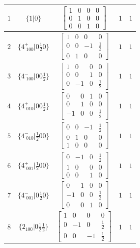 \documentclass[fleqn,8pt]{jsarticle}
\begin{document}
\begin{longtable}{ccccc}
$ 1 $ & $ \{1|0\} $ & $ \begin{bmatrix} 1 & 0 & 0 & 0 \\ 0 & 1 & 0 & 0 \\ 0 & 0 & 1 & 0 \end{bmatrix} $ & $ 1 $ & $ 1 $ \\ \hline
$ 2 $ & $ \{4^{+}_{\,\,100}|0 \frac{1}{2} 0\} $ & $ \begin{bmatrix} 1 & 0 & 0 & 0 \\ 0 & 0 & -1 & \frac{1}{2} \\ 0 & 1 & 0 & 0 \end{bmatrix} $ & $ 1 $ & $ 1 $ \\ \hline
$ 3 $ & $ \{4^{-}_{\,\,100}|0 0 \frac{1}{2}\} $ & $ \begin{bmatrix} 1 & 0 & 0 & 0 \\ 0 & 0 & 1 & 0 \\ 0 & -1 & 0 & \frac{1}{2} \end{bmatrix} $ & $ 1 $ & $ 1 $ \\ \hline
$ 4 $ & $ \{4^{+}_{\,\,010}|0 0 \frac{1}{2}\} $ & $ \begin{bmatrix} 0 & 0 & 1 & 0 \\ 0 & 1 & 0 & 0 \\ -1 & 0 & 0 & \frac{1}{2} \end{bmatrix} $ & $ 1 $ & $ 1 $ \\ \hline
$ 5 $ & $ \{4^{-}_{\,\,010}|\frac{1}{2} 0 0\} $ & $ \begin{bmatrix} 0 & 0 & -1 & \frac{1}{2} \\ 0 & 1 & 0 & 0 \\ 1 & 0 & 0 & 0 \end{bmatrix} $ & $ 1 $ & $ 1 $ \\ \hline
$ 6 $ & $ \{4^{+}_{\,\,001}|\frac{1}{2} 0 0\} $ & $ \begin{bmatrix} 0 & -1 & 0 & \frac{1}{2} \\ 1 & 0 & 0 & 0 \\ 0 & 0 & 1 & 0 \end{bmatrix} $ & $ 1 $ & $ 1 $ \\ \hline
$ 7 $ & $ \{4^{-}_{\,\,001}|0 \frac{1}{2} 0\} $ & $ \begin{bmatrix} 0 & 1 & 0 & 0 \\ -1 & 0 & 0 & \frac{1}{2} \\ 0 & 0 & 1 & 0 \end{bmatrix} $ & $ 1 $ & $ 1 $ \\ \hline
$ 8 $ & $ \{2{}_{100}|0 \frac{1}{2} \frac{1}{2}\} $ & $ \begin{bmatrix} 1 & 0 & 0 & 0 \\ 0 & -1 & 0 & \frac{1}{2} \\ 0 & 0 & -1 & \frac{1}{2} \end{bmatrix} $ & $ 1 $ & $ 1 $ \\ \hline

\end{longtable}
\end{document}
